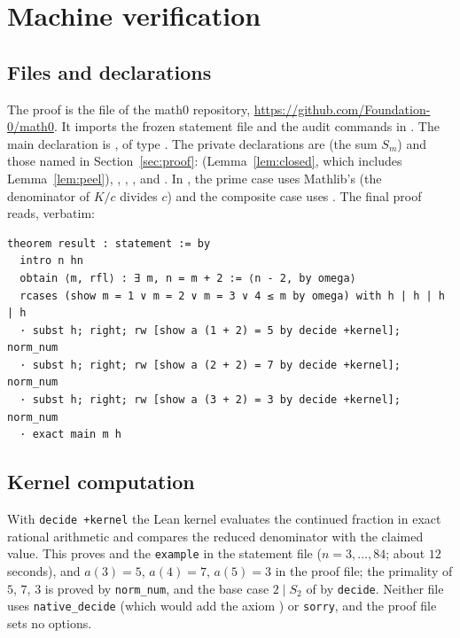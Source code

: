 \documentclass[11pt]{amsart}
\theoremstyle{plain}
\theoremstyle{definition}
\begin{document}
\section{Machine verification}\label{sec:lean}

\subsection*{Files and declarations}
The proof is the file  of the math0 repository, \url{https://github.com/Foundation-0/math0}. It imports the frozen statement file and the audit commands in . The main declaration is , of type . The private declarations are  (the sum $S_m$) and those named in Section~\ref{sec:proof}:  (Lemma~\ref{lem:closed}, which includes Lemma~\ref{lem:peel}), , , ,  and . In , the prime case uses Mathlib's  (the denominator of $K/c$ divides $c$) and the composite case uses . The final proof reads, verbatim:
\begin{lstlisting}
theorem result : statement := by
  intro n hn
  obtain ⟨m, rfl⟩ : ∃ m, n = m + 2 := ⟨n - 2, by omega⟩
  rcases (show m = 1 ∨ m = 2 ∨ m = 3 ∨ 4 ≤ m by omega) with h | h | h | h
  · subst h; right; rw [show a (1 + 2) = 5 by decide +kernel]; norm_num
  · subst h; right; rw [show a (2 + 2) = 7 by decide +kernel]; norm_num
  · subst h; right; rw [show a (3 + 2) = 3 by decide +kernel]; norm_num
  · exact main m h
\end{lstlisting}

\subsection*{Kernel computation}
With \texttt{decide +kernel} the Lean kernel evaluates the continued fraction in exact rational arithmetic and compares the reduced denominator with the claimed value. This proves  and the \texttt{example} in the statement file ($n=3,\dots,84$; about $12$ seconds), and $a(3)=5$, $a(4)=7$, $a(5)=3$ in the proof file; the primality of $5$, $7$, $3$ is proved by \texttt{norm\_num}, and the base case $2\mid S_2$ of  by \texttt{decide}. Neither file uses \texttt{native\_decide} (which would add the axiom ) or \texttt{sorry}, and the proof file sets no options.
\end{document}
